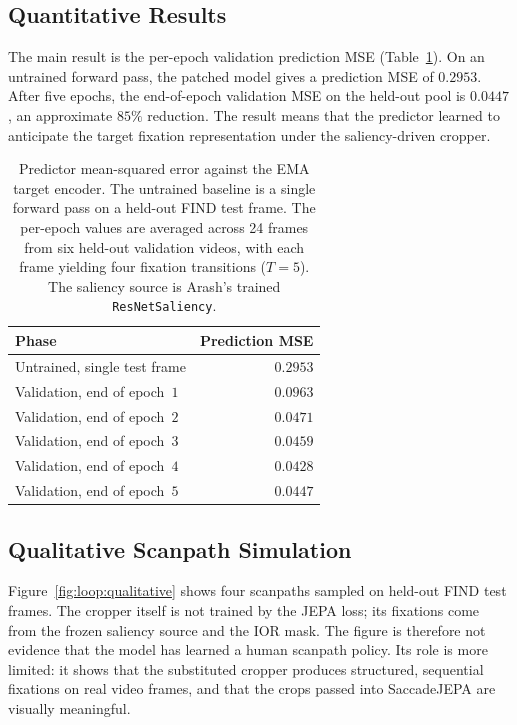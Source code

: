 \documentclass[12pt,a4paper]{article}
\begin{document}
\subsection{Quantitative Results}
\label{subsec:loop:results}

The main result is the per-epoch validation prediction MSE
(Table~\ref{tab:loop:mse}). On an untrained forward pass, the patched model
gives a prediction MSE of $0.2953$. After five epochs, the end-of-epoch
validation MSE on the held-out pool is $0.0447$, an approximate $85\%$
reduction. The result means that the predictor learned to anticipate the
target fixation representation under the saliency-driven cropper.

\begin{table}[ht]
  \centering
  \begin{tabular}{lr}
    \toprule
    Phase & Prediction MSE \\
    \midrule
    Untrained, single test frame                                & $0.2953$ \\
    \addlinespace
    Validation, end of epoch~$1$                                & $0.0963$ \\
    Validation, end of epoch~$2$                                & $0.0471$ \\
    Validation, end of epoch~$3$                                & $0.0459$ \\
    Validation, end of epoch~$4$                                & $0.0428$ \\
    Validation, end of epoch~$5$                                & $0.0447$ \\
    \bottomrule
  \end{tabular}
  \caption{Predictor mean-squared error against the EMA target encoder. The
    untrained baseline is a single forward pass on a held-out FIND test
    frame. The per-epoch values are averaged across 24 frames from six
    held-out validation videos, with each frame yielding four fixation
    transitions ($T{=}5$). The saliency source is Arash's trained
    \texttt{ResNetSaliency}.}
  \label{tab:loop:mse}
\end{table}

\subsection{Qualitative Scanpath Simulation}

Figure~\ref{fig:loop:qualitative} shows four scanpaths sampled on held-out FIND
test frames. The cropper itself is not trained by the JEPA loss; its fixations
come from the frozen saliency source and the IOR mask. The figure is therefore
not evidence that the model has learned a human scanpath policy. Its role is
more limited: it shows that the substituted cropper produces structured,
sequential fixations on real video frames, and that the crops passed into
SaccadeJEPA are visually meaningful.
\end{document}
